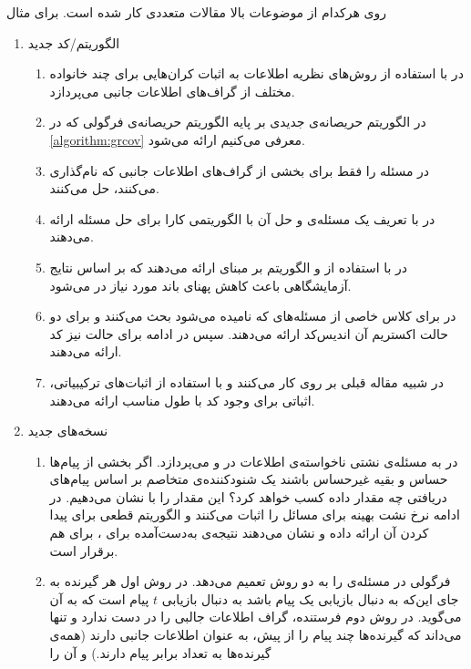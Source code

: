  روی هرکدام از موضوعات بالا مقالات متعددی کار شده است. برای مثال
 \begin{enumerate}
 	\item الگوریتم‌/کد جدید
 	\begin{enumerate}
 		\item 
 		 در
 		\cite{8278015}
 		با استفاده از روش‌های نظریه اطلاعات به اثبات کران‌هایی برای چند خانواده مختلف از گراف‌های اطلاعات جانبی می‌پردازد.
 		\item 
 		در
 		\cite{10313405}
 		الگوریتم حریصانه‌ی جدیدی بر پایه الگوریتم حریصانه‌ی فرگولی که در
   \autoref{algorithm:grcov}
   معرفی می‌کنیم ارائه می‌شود.
 		\item
 		در
 		\cite{8871209}
 		مسئله را فقط برای بخشی از گراف‌های اطلاعات جانبی که
 		نام‌گذاری می‌کنند، حل می‌کنند.
 		\item
 		در
 		\cite{9759449}
 		با تعریف یک مسئله‌ی
 		و حل آن با 
 		الگوریتمی کارا برای حل مسئله ارائه می‌دهند.
 		\item
 		در
 		\cite{8682270}
 		با استفاده از
 		\picod
 		و الگوریتم بر مبنای
 		ارائه می‌دهند که بر اساس نتایج آزمایشگاهی باعث کاهش پهنای باند مورد نیاز در
 		می‌شود.
 		\item
 		در
 		\cite{sasi2019pliable}
 		برای کلاس خاصی از مسئله‌‌های
 		\picod
 		که
 		نامیده می‌شود بحث می‌کنند و برای دو حالت اکستریم آن اندیس‌کد ارائه می‌دهند. سپس در ادامه برای حالت
 		نیز کد ارائه می‌دهند.
 		\item 
 		در
 		\cite{8613483}
 		شبیه مقاله قبلی بر روی
 		کار می‌کنند و با استفاده از اثبات‌های ترکیبیاتی، اثباتی برای وجود کد با طول مناسب ارائه می‌دهند.
 	\end{enumerate}
 	\item نسخه‌های جدید
 	\begin{enumerate}
 		\item
 		 در
 		\cite{10015670}
 		به مسئله‌ی نشتی ناخواسته‌ی اطلاعات در
 		\icod
 		و
 		\picod
 		می‌پردازد. اگر بخشی از پیام‌ها حساس و بقیه غیرحساس باشند یک شنودکننده‌ی متخاصم بر اساس پیام‌های دریافتی چه مقدار داده کسب خواهد کرد؟ این مقدار را با
 		نشان می‌دهیم. در ادامه نرخ نشت بهینه برای مسائل
 		\icod
 	را اثبات می‌کنند و الگوریتم قطعی برای پیدا کردن آن ارائه داده و نشان می‌دهند نتیجه‌ی به‌دست‌آمده برای
 		\icods،
 		برای
 		\picod
 		هم برقرار است.
 		\item 
 		فرگولی در
 		\cite{6620405}
 		مسئله‌ی
 		\picod
 		را به دو روش تعمیم می‌دهد. در روش اول هر گیرنده به جای این‌که به دنبال بازیابی یک پیام باشد به دنبال بازیابی
 		$t$
 		پیام است که به آن
 		می‌گوید.
 		در روش دوم فرستنده، گراف اطلاعات جالبی را در دست ندارد و تنها می‌داند که گیرنده‌ها چند پیام را از پیش، به عنوان اطلاعات جانبی دارند (همه‌ی گیرنده‌ها به تعداد برابر پیام دارند.) و آن را
 		

\end{enumerate}
\end{enumerate}
